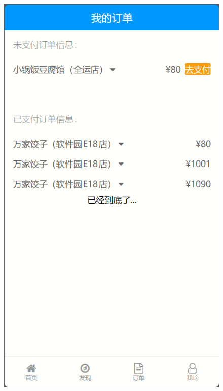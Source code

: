 \begin{figure}[h]
    \centering
    \begin{minipage}[b]{0.3\linewidth}
        \includegraphics[width=\linewidth]{uiFigs/订单列表.png}
     \end{minipage}
    \begin{minipage}[b]{0.3\linewidth}

\end{minipage}
\end{figure}
